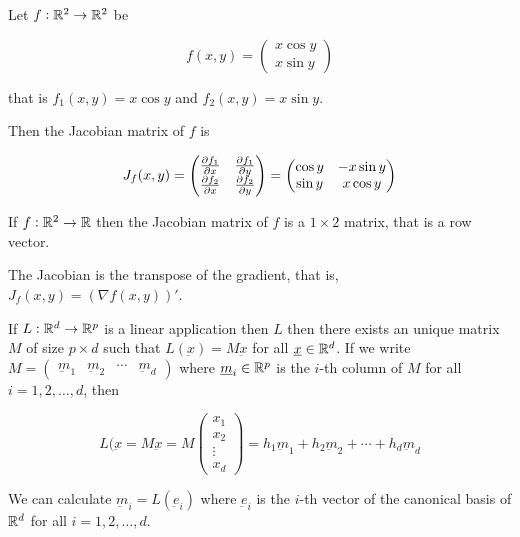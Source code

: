 \documentclass[12pt]{report}
\renewcommand{\vec}[1]{\underbar{\ensuremath{#1}}}
\begin{document}
\begin{example}
    Let $f: \mathbb{R}^2 \to \mathbb{R}^2$ be

    $$
        f(x, y) = \begin{pmatrix}
            x \cos y \\
            x \sin y
        \end{pmatrix}
    $$

    that is $f_1(x, y) = x \cos y$ and $f_2(x, y) = x \sin y$.

    Then the Jacobian matrix of $f$ is

    $$
        J_f(x, y) = \begin{pmatrix}
            \pdv{f_1}{x}() & \pdv{f_1}{y}() \\
            \pdv{f_2}{x}() & \pdv{f_2}{y}()
        \end{pmatrix} = \begin{pmatrix}
            \cos y & -x \sin y \\
            \sin y & x \cos y
        \end{pmatrix}
    $$
\end{example}

\begin{example}[Jacobian of $f: \R^2 \to \R$]
    If $f: \R^2 \to \R$ then the Jacobian matrix of $f$ is a $1 \times 2$ matrix, that is a row vector.
\end{example}

\begin{remark}
    The Jacobian is the transpose of the gradient, that is, $J_f(x, y) = \left(\nabla f(x, y)\right)'$.
\end{remark}

\begin{lemma}
    If $L: \mathbb{R}^d \to \mathbb{R}^p$ is a linear application then $L$ then there exists an unique matrix $M$ of size $p \times d$ such that $L(\vec{x}) = M \vec{x}$ for all $\vec{x} \in \R^d$.
    If we write $M = \begin{pmatrix} \vec{m}_1 & \vec{m}_2 & \cdots & \vec{m}_d \end{pmatrix}$ where $\vec{m}_i \in \R^p$ is the $i$-th column of $M$ for all $i = 1, 2, \ldots, d$, then

    $$
        L(\vec{x} = M\vec{x} = M \begin{pmatrix}
            x_1    \\
            x_2    \\
            \vdots \\
            x_d
        \end{pmatrix} = h_1 \vec{m}_1 + h_2 \vec{m}_2 + \cdots + h_d \vec{m}_d
    $$
\end{lemma}
\begin{remark}
    We can calculate $\vec{m}_i = L(\vec{e}_i)$ where $\vec{e}_i$ is the $i$-th vector of the canonical basis of $\mathbb{R}^d$ for all $i = 1, 2, \ldots, d$.
\end{remark}
\end{document}
